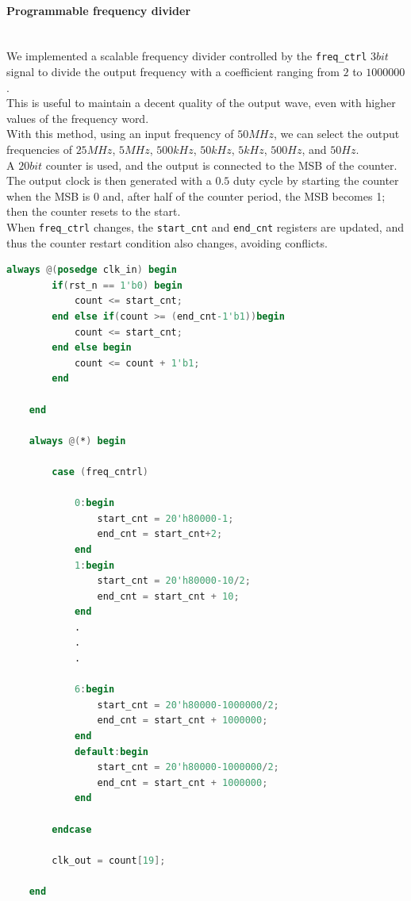 \newpage

\paragraph{Programmable frequency divider} \quad \\
We implemented a scalable frequency divider controlled by the \texttt{freq\_ctrl} \(3 bit\) signal to divide the output frequency with a coefficient ranging from \(2\) to \(1000000\).\\
This is useful to maintain a decent quality of the output wave, even with higher values of the frequency word.\\
With this method, using an input frequency of \(50MHz\), we can select the output frequencies of \(25MHz\), \(5MHz\), \(500kHz\), \(50kHz\), \(5kHz\), \(500Hz\), and \(50Hz\).\\
A \(20 bit\) counter is used, and the output is connected to the MSB of the counter.\\
The output clock is then generated with a \(0.5\) duty cycle by starting the counter when the MSB is 0 and, after half of the counter period, the MSB becomes 1; then the counter resets to the start.\\
When \texttt{freq\_ctrl} changes, the \texttt{start\_cnt} and \texttt{end\_cnt} registers are updated, and thus the counter restart condition also changes, avoiding conflicts.


\vspace{1cm}
\begin{lstlisting}[language=Verilog, caption=Programmable frequency divider,
    label=lst:Prog_freq_div ] 
    always @(posedge clk_in) begin
        if(rst_n == 1'b0) begin
            count <= start_cnt;
        end else if(count >= (end_cnt-1'b1))begin
            count <= start_cnt;
        end else begin
            count <= count + 1'b1; 	
        end
        
    end

    always @(*) begin
    
        case (freq_cntrl)
            
            0:begin 
                start_cnt = 20'h80000-1;
                end_cnt = start_cnt+2; 
            end
            1:begin
                start_cnt = 20'h80000-10/2;
                end_cnt = start_cnt + 10;
            end
            .
            .
            .
            
            6:begin
                start_cnt = 20'h80000-1000000/2;
                end_cnt = start_cnt + 1000000;
            end
            default:begin
                start_cnt = 20'h80000-1000000/2;
                end_cnt = start_cnt + 1000000;
            end
            
        endcase 
    
        clk_out = count[19];
        
    end
    
\end{lstlisting}
\vspace{1cm}

